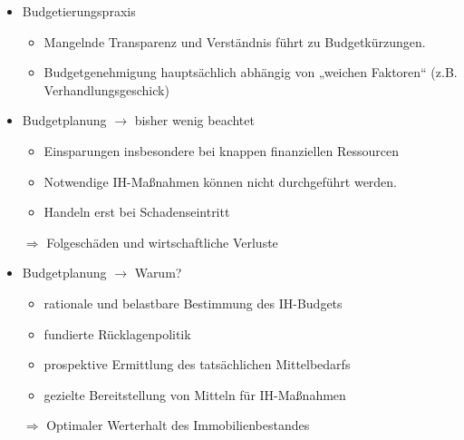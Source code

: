 \documentclass[fleqn,twoside,dvipsnames]{article}
\begin{document}
\begin{itemize}
            \item Budgetierungspraxis
                \begin{itemize}
                    \item Mangelnde Transparenz und Verständnis führt zu Budgetkürzungen.
                    \item Budgetgenehmigung hauptsächlich abhängig von „weichen Faktoren“ (z.B. Verhandlungsgeschick)
                \end{itemize}
            \item Budgetplanung $\rightarrow$ bisher wenig beachtet
                \begin{itemize}
                    \item Einsparungen insbesondere bei knappen finanziellen Ressourcen
                    \item Notwendige IH-Maßnahmen können nicht durchgeführt werden.
                    \item Handeln erst bei Schadenseintritt
                \end{itemize}
                $\Rightarrow$ Folgeschäden und wirtschaftliche Verluste
            \item Budgetplanung $\rightarrow$ Warum?
                \begin{itemize}
                    \item rationale und belastbare Bestimmung des IH-Budgets
                    \item fundierte Rücklagenpolitik
                    \item prospektive Ermittlung des tatsächlichen Mittelbedarfs
                    \item gezielte Bereitstellung von Mitteln für IH-Maßnahmen
                \end{itemize}
                   $\Rightarrow$ Optimaler Werterhalt des Immobilienbestandes
        \end{itemize}
    
\end{document}
